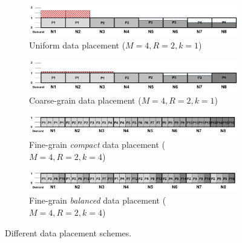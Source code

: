 \begin{figure}[!htbp]
\begin{subfigure}[b]{0.9\textwidth}
    \includegraphics[width=\linewidth]{figures/dp_final_uniform.pdf}
    \caption{Uniform data placement ($M=4,R=2,k=1$)}
    \label{fig:dp_uniform}
\end{subfigure}
\hfill
\begin{subfigure}[b]{0.9\textwidth}
    \includegraphics[width=\linewidth]{figures/dp_final_coarse.pdf}
    \caption{Coarse-grain data placement ($M=4,R=2,k=1$)}
    \label{fig:dp_coarse}
\end{subfigure}
\hfill
\begin{subfigure}[b]{0.9\textwidth}
    \includegraphics[width=\linewidth]{figures/dp_final_fine_monochromatic.pdf}
    \caption{Fine-grain \emph{compact} data placement ($M=4,R=2,k=4$)}
    \label{fig:dp_fine_monochromatic}
\end{subfigure}
\hfill
\begin{subfigure}[b]{0.9\textwidth}
    \includegraphics[width=\linewidth]{figures/dp_final_fine_rainbow.pdf}
    \caption{Fine-grain \emph{balanced} data placement ($M=4,R=2,k=4$)}
    \label{fig:dp_fine_rainbow}
\end{subfigure}
\centering
\caption{Different data placement schemes.}
\label{fig:dp_schemes}
\end{figure}
